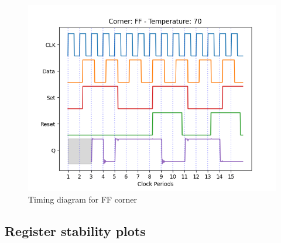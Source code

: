 \begin{figure}[H]
    \centering
    \begin{minipage}{0.5\textwidth}
        \centering
        \includegraphics[width=\textwidth]{Figures/Aimspice_Plots/FF_70.png}
        \caption{Timing diagram for FF corner}
        \label{fig:FF70}
    \end{minipage}%
\end{figure}


\subsection{Register stability plots}
\label{appendix:register_stability}

